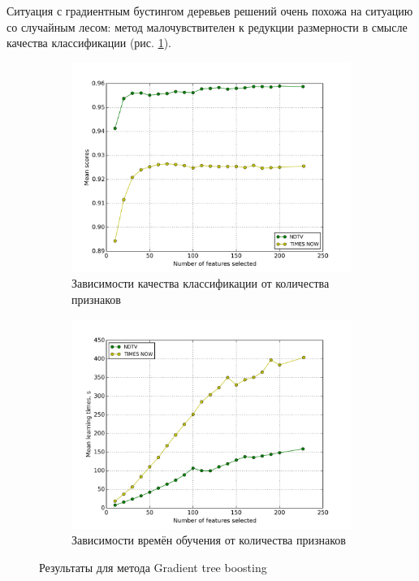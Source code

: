 \par
Ситуация с градиентным бустингом деревьев решений очень похожа на ситуацию со случайным лесом: метод малочувствителен к редукции размерности в смысле качества классификации (рис. \ref{fig:gtb_rfs}).

\begin{figure}[h!]
    \centering
	\begin{subfigure}{0.45\textwidth}
		\includegraphics[width=\textwidth]{images/RFS-GTB.png}
		\caption{Зависимости качества классификации от количества признаков}
	\end{subfigure}
	\begin{subfigure}{0.45\textwidth}
		\includegraphics[width=\textwidth]{images/RFS-GTBTime.png}
		\caption{Зависимости времён обучения от количества признаков}
	\end{subfigure}
	\caption{Результаты для метода Gradient tree boosting}\label{fig:gtb_rfs}
\end{figure}
\par
